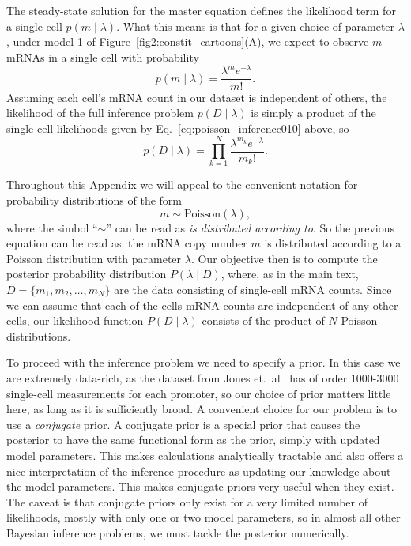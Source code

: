 The steady-state solution for the master equation defines the likelihood term
for a single cell $p(m \mid \lambda)$. What this means is that for a given
choice of parameter $\lambda$, under model 1 of
Figure~\ref{fig2:constit_cartoons}(A), we expect to observe $m$ mRNAs in a
single cell with probability
\begin{equation}
p(m\mid\lambda) = \frac{\lambda^m e^{-\lambda}}{m!}.
\label{eq:poisson_inference010}
\end{equation}
Assuming each cell's mRNA count in our dataset is independent of others, the
likelihood of the full inference problem $p(D\mid\lambda)$ is simply a product
of the single cell likelihoods given by Eq.~\ref{eq:poisson_inference010} above, so
\begin{equation}
p(D\mid\lambda) = \prod_{k=1}^N \frac{\lambda^{m_k}e^{-\lambda}}{m_k!}.
\end{equation}

Throughout this Appendix we will appeal to the convenient notation for
probability distributions of the form
\begin{equation}
m \sim \text{Poisson}(\lambda),
\end{equation}
where the simbol ``$\sim$'' can be read as \textit{is distributed according to}.
So the previous equation can be read as: the mRNA copy number $m$ is distributed
according to a Poisson distribution with parameter $\lambda$. Our objective then
is to compute the posterior probability distribution $P(\lambda \mid D)$, where,
as in the main text, $D = \{ m_1, m_2, \ldots, m_N \}$ are the data consisting
of single-cell mRNA counts. Since we can assume that each of the cells mRNA
counts are independent of any other cells, our likelihood function $P(D \mid
\lambda)$ consists of the product of $N$ Poisson distributions.

To proceed with the inference problem we need to specify a prior. In this case
we are extremely data-rich, as the dataset from Jones et.\ al~\cite{Jones2014}
has of order 1000-3000 single-cell measurements for each promoter, so our choice
of prior matters little here, as long as it is sufficiently broad. A convenient
choice for our problem is to use a \textit{conjugate} prior. A conjugate prior
is a special prior that causes the posterior to have the same functional form as
the prior, simply with updated model parameters. This makes calculations
analytically tractable and also offers a nice interpretation of the inference
procedure as updating our knowledge about the model parameters. This makes
conjugate priors very useful when they exist. The caveat is that conjugate
priors only exist for a very limited number of likelihoods, mostly with only one
or two model parameters, so in almost all other Bayesian inference problems, we
must tackle the posterior numerically.

